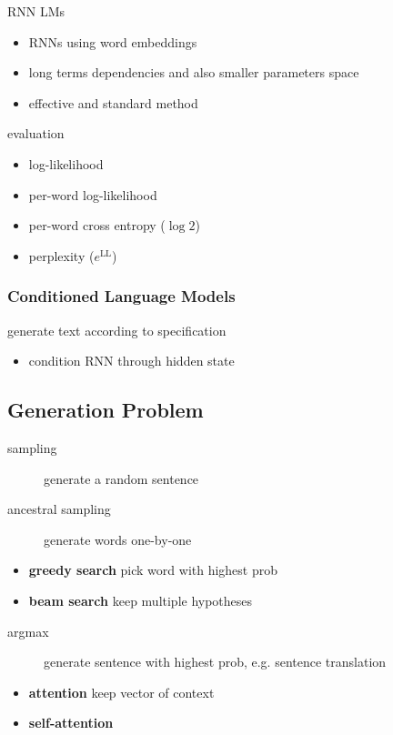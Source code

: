 \documentclass[]{article}
\theoremstyle{definition}
\begin{document}
    RNN LMs
    \begin{itemize}
        \item RNNs using word embeddings
        \item long terms dependencies and also smaller parameters space
        \item effective and standard method
    \end{itemize}

    evaluation
    \begin{itemize}
        \item log-likelihood
        \item per-word log-likelihood
        \item per-word cross entropy ($\log 2$)
        \item perplexity ($e^{\text{LL}}$)
    \end{itemize}

    \subsubsection{Conditioned Language Models}%
    \label{ssub:conditioned_language_models}

    generate text according to specification
    \begin{itemize}
        \item condition RNN through hidden state
    \end{itemize}

    \subsection{Generation Problem}%
    \label{sub:generation_problem}

    \begin{description}
        \item[sampling] generate a random sentence
        \item[ancestral sampling] generate words one-by-one
    \end{description}

    \begin{itemize}
        \item \textbf{greedy search} pick word with highest prob
        \item \textbf{beam search} keep multiple hypotheses
    \end{itemize}

    \begin{description}
        \item[argmax] generate sentence with highest prob, e.g. sentence translation
    \end{description}
    \begin{itemize}
        \item \textbf{attention} keep vector of context
        \item \textbf{self-attention}
    \end{itemize}
\end{document}
